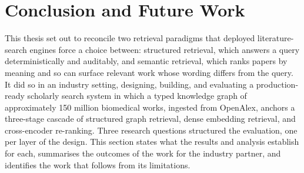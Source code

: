 %
%
%
%
%

\section{Conclusion and Future Work}
\label{sec:conclusion}

This thesis set out to reconcile two retrieval paradigms that deployed literature-search engines force a choice between: structured retrieval, which answers a query deterministically and auditably, and semantic retrieval, which ranks papers by meaning and so can surface relevant work whose wording differs from the query. It did so in an industry setting, designing, building, and evaluating a production-ready scholarly search system in which a typed knowledge graph of approximately 150 million biomedical works, ingested from OpenAlex, anchors a three-stage cascade of structured graph retrieval, dense embedding retrieval, and cross-encoder re-ranking. Three research questions structured the evaluation, one per layer of the design. This section states what the results and analysis establish for each, summarises the outcomes of the work for the industry partner, and identifies the work that follows from its limitations.

